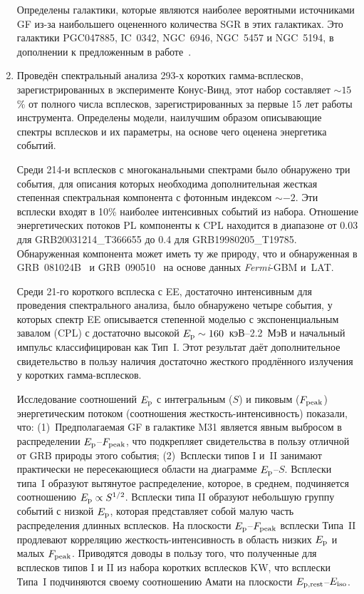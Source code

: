 \begin{enumerate}
    Определены галактики, которые являются наиболее вероятными источниками GF 
    из-за наибольшего оцененного количества SGR в этих галактиках. Это галактики
    PGC047885, IC~0342, NGC~6946, NGC~5457 и NGC~5194, в дополнении к предложенным 
    в работе~\citep{Popov2006}.
  
\item Проведён спектральный анализа 293-х коротких гамма-всплесков,
    зарегистрированных в эксперименте Конус-Винд, этот набор составляет $\sim 15$\% 
    от полного числа всплесков, зарегистрированных за первые 15 лет работы инструмента.
    Определены модели, наилучшим образом описывающие спектры всплесков и их параметры,
    на основе чего оценена энергетика событий. 
    
    Среди 214-и всплесков с многоканальными спектрами было обнаружено три
    события, для описания которых необходима дополнительная жесткая степенная 
    спектральная компонента с фотонным индексом $\sim -2$. Эти всплески входят в 10\%
    наиболее интенсивных событий из набора. Отношение энергетических потоков PL
    компоненты к CPL находится в диапазоне от 0.03 для GRB20031214\_T366655 до
    0.4 для GRB19980205\_T19785. Обнаруженная компонента может иметь ту же природу,
    что и обнаруженная в GRB~081024B~\citep{Abdo_2010ApJ_712_558A} и 
    GRB~090510~\citep{Ackermann_2010ApJ_716_1178A} на основе данных \textit{Fermi}-GBM и~LAT.
    
    Среди 21-го короткого всплеска с EE, достаточно интенсивным 
    для проведения спектрального анализа, было обнаружено четыре события, у которых 
    спектр EE описывается степенной моделью с экспоненциальным завалом (CPL) 
    с достаточно высокой $E_{\mathrm{p}} \sim 160$~кэВ--2.2~МэВ и начальный импульс 
    классифицирован как Тип~I. Этот результат даёт дополнительное свидетельство 
    в пользу наличия достаточно жесткого продлённого излучения у коротких гамма-всплесков. 
    
    Исследование соотношений $E_{\mathrm{p}}$ с интегральным ($S$) и пиковым ($F_{\mathrm{peak}}$) 
    энергетическим потоком (соотношения жесткость-интенсивность) показали, что:
    (1)~Предполагаемая GF в галактике M31 является явным выбросом в распределении $E_{\mathrm{p}}$--$F_{\mathrm{peak}}$, 
    что подкрепляет свидетельства в пользу отличной от GRB природы этого события;
    (2)~Всплески типов I и~II занимают практически не пересекающиеся области на диаграмме $E_{\mathrm{p}}$--$S$.
    Всплески типа~I образуют вытянутое распределение, которое, в среднем, подчиняется 
    соотношению $E_{\mathrm{p}} \propto S^{1/2}$. Всплески типа II образуют небольшую группу событий
    с низкой $E_{\mathrm{p}}$, которая представляет собой малую часть распределения длинных всплесков.
    На плоскости $E_{\mathrm{p}}$--$F_{\mathrm{peak}}$ всплески Типа~II продлевают корреляцию 
    жесткость-интенсивность в область низких $E_{\mathrm{p}}$ и малых $F_{\mathrm{peak}}$.
    Приводятся доводы в пользу того, что полученные для всплесков типов I и II из набора коротких 
    всплесков KW,  что всплески Типа~I подчиняются 
    своему соотношению Амати на плоскости $E_{\mathrm{p,rest}}$--$E_{\mathrm{iso}}$.
  
\end{enumerate}


\clearpage
